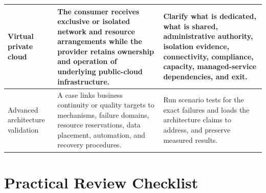 \documentclass[11pt]{article}
\begin{document}
\begin{longtable}{@{}>{\RaggedRight\arraybackslash}p{}>{\RaggedRight\arraybackslash}p{}>{\RaggedRight\arraybackslash}p{}@{}}
Virtual private cloud & The consumer receives exclusive or isolated network and resource arrangements while the provider retains ownership and operation of underlying public-cloud infrastructure. & Clarify what is dedicated, what is shared, administrative authority, isolation evidence, connectivity, compliance, capacity, managed-service dependencies, and exit. \\\midrule
Advanced architecture validation & A case links business continuity or quality targets to mechanisms, failure domains, resource reservations, data placement, automation, and recovery procedures. & Run scenario tests for the exact failures and loads the architecture claims to address, and preserve measured results. \\\midrule
\bottomrule
\end{longtable}
\endgroup
\section{Practical Review Checklist}
\end{document}
